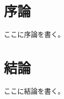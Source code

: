 \documentclass[10pt,a4paper,oneside,twocolumn,fleqn,dvipdfmx]{jsarticle}
\title{\LARGE{\@documenttitle}}
\author{\Large{\@authorname}\\\@affiliation}
\date{}
\affiliation{東京大学 藤本・清水・藤田研究室}
\begin{document}
\begin{abstract}
    ここに概要を書く。
\end{abstract}

\maketitle
\thispagestyle{fancy}

\section{序論}
ここに序論を書く。

\section{結論}
ここに結論を書く。







% 
% 
\end{document}
